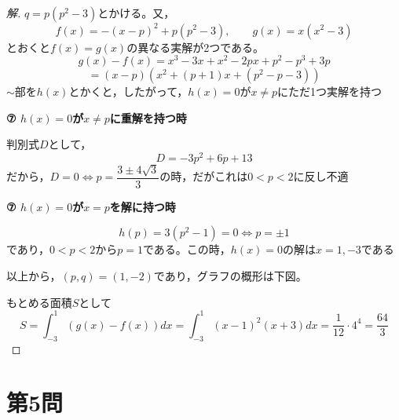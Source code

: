 \documentclass[../main.tex]{subfiles}
\begin{document}
\begin{proof}[解]
  $q=p(p^2-3)$とかける。又，
  \[
    f(x)=-(x-p)^2+p(p^2-3), \qquad g(x)=x(x^2-3)
  \]
  とおくと$f(x)=g(x)$の異なる実解が2つである。
  \[
    g(x)-f(x)=x^3-3x+x^2-2px+p^2-p^3+3p
  \]
  \[
    =(x-p)\left(x^2+(p+1)x+(p^2-p-3)\right)
  \]
  $\sim$部を$h(x)$とかくと，したがって，$h(x)=0$が$x\ne p$にただ1つ実解を持つ

  \textbf{⑦ $h(x)=0$が$x\ne p$に重解を持つ時}

  判別式$D$として，
  \[
    D=-3p^2+6p+13
  \]
  だから，$D=0\iff p=\dfrac{3\pm4\sqrt3}{3}$の時，だがこれは$0<p<2$に反し不適

  \textbf{⑦ $h(x)=0$が$x=p$を解に持つ時}

  \[
    h(p)=3(p^2-1)=0\iff p=\pm1
  \]
  であり，$0<p<2$から$p=1$である。この時，$h(x)=0$の解は$x=1,-3$である

  以上から，$(p,q)=(1,-2)$であり，グラフの概形は下図。

  \begin{center}
  \end{center}

  もとめる面積$S$として
  \[
    S=\int_{-3}^1(g(x)-f(x))dx=\int_{-3}^1(x-1)^2(x+3)dx=\frac{1}{12}\cdot4^4=\frac{64}{3}
  \]
\end{proof}

\newpage

\section*{第5問}
\end{document}
